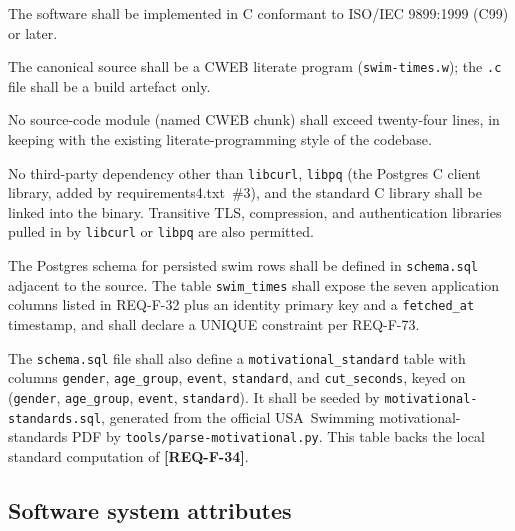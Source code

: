 \documentclass[12pt]{article}
\newcommand{\code}[1]{\texttt{#1}}
\newcommand{\req}[1]{\textbf{[#1]}}
\begin{document}
\begin{description}[style=nextline]
  \item[\req{REQ-D-01}] The software shall be implemented in C
        conformant to ISO/IEC 9899:1999 (C99) or later.
  \item[\req{REQ-D-02}] The canonical source shall be a CWEB
        literate program (\code{swim-times.w}); the
        \code{.c} file shall be a build artefact only.
  \item[\req{REQ-D-03}] No source-code module (named CWEB chunk)
        shall exceed twenty-four lines, in keeping with the
        existing literate-programming style of the codebase.
  \item[\req{REQ-D-04}] No third-party dependency other than
        \code{libcurl}, \code{libpq} (the Postgres C client
        library, added by requirements4.txt~\#3), and the standard
        C library shall be linked into the binary.  Transitive
        TLS, compression, and authentication libraries pulled in
        by \code{libcurl} or \code{libpq} are also permitted.
  \item[\req{REQ-D-10}] The Postgres schema for persisted swim
        rows shall be defined in \texttt{schema.sql} adjacent to
        the source.  The table \texttt{swim\_times} shall expose
        the seven application columns listed in REQ-F-32 plus an
        identity primary key and a \texttt{fetched\_at} timestamp,
        and shall declare a UNIQUE constraint per REQ-F-73.
  \item[\req{REQ-D-11}]\label{sec:req-db} The \texttt{schema.sql} file
        shall also define a \texttt{motivational\_standard} table with
        columns \code{gender}, \code{age\_group}, \code{event},
        \code{standard}, and \code{cut\_seconds}, keyed on
        (\code{gender}, \code{age\_group}, \code{event}, \code{standard}).
        It shall be seeded by \texttt{motivational-standards.sql},
        generated from the official USA~Swimming motivational-standards
        PDF by \texttt{tools/parse-motivational.py}.  This table backs
        the local standard computation of \req{REQ-F-34}.
\end{description}

\subsection{Software system attributes}
\end{document}
